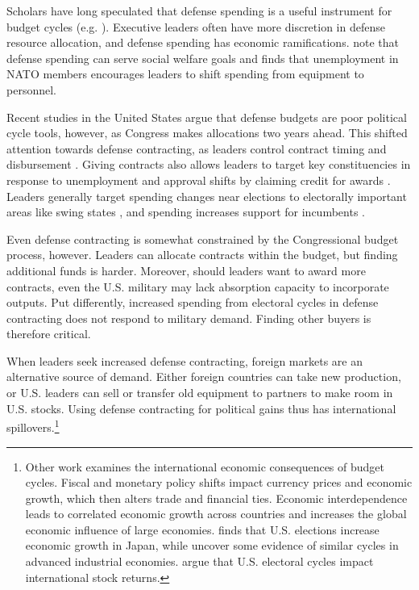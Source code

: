 \documentclass[12pt]{article}
\begin{document}
Scholars have long speculated that defense spending is a useful instrument for budget cycles (e.g. \cite{Tufte1978, Mintz1988}).
Executive leaders often have more discretion in defense resource allocation, and defense spending has economic ramifications.
\citet{WhittenWilliams2011} note that defense spending can serve social welfare goals and \citet{Becker2021} finds that unemployment in NATO members encourages leaders to shift spending from equipment to personnel.


Recent studies in the United States argue that defense budgets are poor political cycle tools, however, as Congress makes allocations two years ahead.
This shifted attention towards defense contracting, as leaders control contract timing and disbursement \citep{Mayer1995, DerouenHeo2000}.
Giving contracts also allows leaders to target key constituencies in response to unemployment and approval shifts by claiming credit for awards \citep{DerouenHeo2000}. 
Leaders generally target spending changes near elections to electorally important areas like swing states \citep{KrinerReeves2015}, and spending increases support for incumbents \citep{KrinerReeves2012}.


Even defense contracting is somewhat constrained by the Congressional budget process, however. 
Leaders can allocate contracts within the budget, but finding additional funds is harder. 
Moreover, should leaders want to award more contracts, even the U.S. military may lack absorption capacity to incorporate outputs.
Put differently, increased spending from electoral cycles in defense contracting does not respond to military demand.
Finding other buyers is therefore critical.


When leaders seek increased defense contracting, foreign markets are an alternative source of demand.
Either foreign countries can take new production, or U.S. leaders can sell or transfer old equipment to partners to make room in U.S. stocks. 
Using defense contracting for political gains thus has international spillovers.\footnote{%
Other work examines the international economic consequences of budget cycles.
Fiscal and monetary policy shifts impact currency prices and economic growth, which then alters trade and financial ties. 
Economic interdependence leads to correlated economic growth across countries \citep{ArtisZhang1999, Kayser2006} and increases the global economic influence of large economies. 
\citet{Ito1991} finds that U.S. elections increase economic growth in Japan, while \citet{ThompsonZuk1983} uncover some evidence of similar cycles in advanced industrial economies.
\citet{FoersterSchmitz1997} argue that U.S. electoral cycles impact international stock returns.
}
\end{document}

